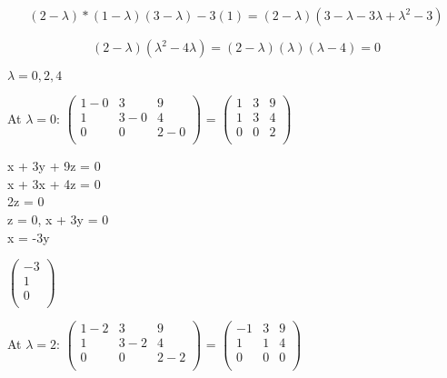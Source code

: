 \documentclass[12pt]{article}
\begin{document}
\begin{enumerate}
        \begin{equation}
            (2 - \lambda) * (1 - \lambda)(3 - \lambda) - 3(1) = (2 - \lambda)(3 - \lambda - 3\lambda + \lambda^2 - 3)
        \end{equation}

        \begin{equation}
            (2 - \lambda)(\lambda^2 - 4\lambda) = (2 - \lambda)(\lambda)(\lambda - 4) = 0
        \end{equation}

        $\lambda = 0, 2, 4$

        At $\lambda = 0$: 
            $\begin{pmatrix}
                1 - 0 & 3 & 9 \\
                1 & 3 - 0 & 4 \\
                0 & 0 & 2 - 0\\
            \end{pmatrix}$ = $\begin{pmatrix}
                1 & 3 & 9 \\
                1 & 3 & 4 \\
                0 & 0 & 2\\
            \end{pmatrix}$

            x + 3y + 9z = 0 \\
            x + 3x + 4z = 0 \\ 
            2z = 0 \\

            z = 0, x + 3y = 0 \\
            x = -3y 

            $\begin{pmatrix}
                -3 \\
                1 \\
                0 \\
            \end{pmatrix}$

        At $\lambda = 2$:
        $\begin{pmatrix}
                1 - 2 & 3 & 9 \\
                1 & 3 - 2 & 4 \\
                0 & 0 & 2 - 2\\
            \end{pmatrix}$ = $\begin{pmatrix}
                -1 & 3 & 9 \\
                1 & 1 & 4 \\
                0 & 0 & 0\\
            \end{pmatrix}$


\end{enumerate}
\end{document}
